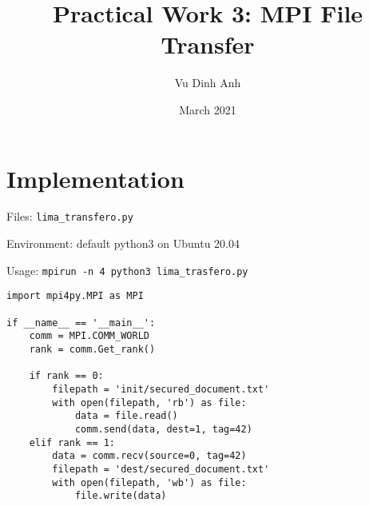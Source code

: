 \documentclass{article}
\title{Practical Work 3: MPI File Transfer}
\author{Vu Dinh Anh}
\date{March 2021}
\begin{document}
\maketitle

\section*{Implementation}

Files: \texttt{lima_transfero.py}

Environment: default python3 on Ubuntu 20.04

Usage: \texttt{mpirun -n 4 python3 lima_trasfero.py}

\begin{verbatim}
import mpi4py.MPI as MPI

if __name__ == '__main__':
    comm = MPI.COMM_WORLD
    rank = comm.Get_rank()

    if rank == 0:
        filepath = 'init/secured_document.txt'
        with open(filepath, 'rb') as file:
            data = file.read()
            comm.send(data, dest=1, tag=42)
    elif rank == 1:
        data = comm.recv(source=0, tag=42)
        filepath = 'dest/secured_document.txt'
        with open(filepath, 'wb') as file:
            file.write(data)
\end{verbatim}
\end{document}
